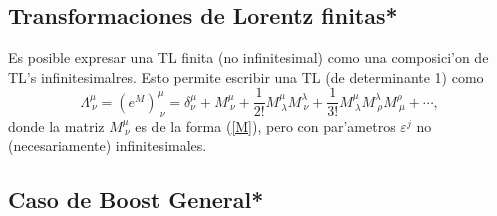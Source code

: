 \subsection{Transformaciones de Lorentz finitas*}
Es posible expresar una TL finita (no infinitesimal) como una composici'on de
TL's infinitesimalres. Esto permite escribir una TL (de determinante 1) como
\begin{equation}
\Lambda^\mu_{\ \nu}=\left( e^M\right)^\mu_{\ \nu}=\delta^\mu_\nu+M^\mu_{\
\nu}+\frac{1}{2!}M^\mu_{\ \lambda}M^\lambda_{\ \nu}+\frac{1}{3!}M^\mu_{\
\lambda}M^\lambda_{\ \rho}M^\rho_{\ \mu}+\cdots ,
\end{equation}
donde la matriz $M^\mu_{\ \nu}$ es de la forma (\ref{M}), pero con par'ametros
$\varepsilon^j$ no (necesariamente) infinitesimales.

\subsection{Caso de Boost General*}

